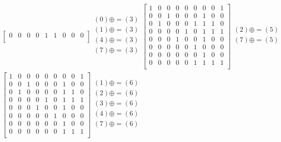 \documentclass[a4paper,10pt]{article} %
\begin{document}
\begin{multline}
\begin{bmatrix}
		0 & 0 & 0 & 0 & 1 & 1 & 0 & 0 & 0 \\
		\end{bmatrix}
		\begin{align}
		(0) \oplus= (3)\\
		(1) \oplus= (3)\\
		(4) \oplus= (3)\\
		(7) \oplus= (3)\\
		\end{align}
		\begin{bmatrix}
		1 & 0 & 0 & 0 & 0 & 0 & 0 & 0 & 1 \\
		0 & 0 & 1 & 0 & 0 & 0 & 1 & 0 & 0 \\
		0 & 1 & 0 & 0 & 0 & 1 & 1 & 1 & 0 \\
		0 & 0 & 0 & 0 & 1 & 0 & 1 & 1 & 1 \\
		0 & 0 & 0 & 1 & 0 & 0 & 1 & 0 & 0 \\
		0 & 0 & 0 & 0 & 0 & 1 & 0 & 0 & 0 \\
		0 & 0 & 0 & 0 & 0 & 0 & 1 & 0 & 0 \\
		0 & 0 & 0 & 0 & 0 & 1 & 1 & 1 & 1 \\
		\end{bmatrix}
		\begin{align}
		(2) \oplus= (5)\\
		(7) \oplus= (5)\\
		\end{align}\\
		\begin{bmatrix}
		1 & 0 & 0 & 0 & 0 & 0 & 0 & 0 & 1 \\
		0 & 0 & 1 & 0 & 0 & 0 & 1 & 0 & 0 \\
		0 & 1 & 0 & 0 & 0 & 0 & 1 & 1 & 0 \\
		0 & 0 & 0 & 0 & 1 & 0 & 1 & 1 & 1 \\
		0 & 0 & 0 & 1 & 0 & 0 & 1 & 0 & 0 \\
		0 & 0 & 0 & 0 & 0 & 1 & 0 & 0 & 0 \\
		0 & 0 & 0 & 0 & 0 & 0 & 1 & 0 & 0 \\
		0 & 0 & 0 & 0 & 0 & 0 & 1 & 1 & 1 \\
		\end{bmatrix}
		\begin{align}
		(1) \oplus= (6)\\
		(2) \oplus= (6)\\
		(3) \oplus= (6)\\
		(4) \oplus= (6)\\
		(7) \oplus= (6)\\

\end{align}
\end{multline}
\end{document}
